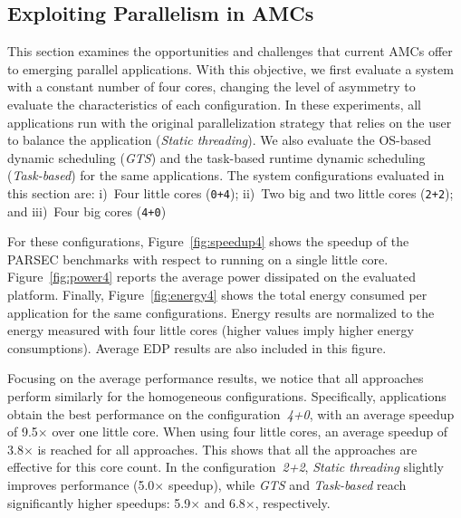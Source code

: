 \subsection{Exploiting Parallelism in AMCs}
\label{sec:eval:A}

This section examines the opportunities and challenges that current AMCs offer to emerging parallel applications. With this objective, we first evaluate a system with a constant number of four cores, changing the level of asymmetry to evaluate the characteristics of each configuration. In these experiments, all applications run with the original parallelization strategy that relies on the user to balance the application (\emph{Static threading}). We also evaluate the OS-based dynamic scheduling (\emph{GTS}) and the task-based runtime dynamic scheduling (\emph{Task-based}) for the same applications. 
The system configurations evaluated in this section are:
i)~Four little cores (\texttt{0+4}); ii)~Two big and two little cores (\texttt{2+2}); and iii)~Four 
big cores (\texttt{4+0})

For these configurations, Figure~\ref{fig:speedup4} shows the speedup of the PARSEC benchmarks with respect to running on a single little core. Figure~\ref{fig:power4} reports the average power dissipated on the evaluated platform. Finally, Figure~\ref{fig:energy4} shows the total energy consumed per application for the same configurations. Energy results are normalized to the energy measured with four little cores (higher values imply higher energy consumptions). Average EDP results are also included in this figure.

Focusing on the average performance results, we notice that all approaches perform similarly for the homogeneous configurations. 
Specifically, applications obtain the best performance on the configuration~\emph{4+0}, with an average speedup of 9.5$\times$ over one little core. 
When using four little cores, an average speedup of 3.8$\times$ is reached for all approaches. 
This shows that all the approaches are effective for this core count. 
In the configuration~\emph{2+2}, \emph{Static threading} slightly improves performance (5.0$\times$ speedup), while \emph{GTS} and \emph{Task-based} reach significantly higher speedups: 5.9$\times$ and 6.8$\times$, respectively.

